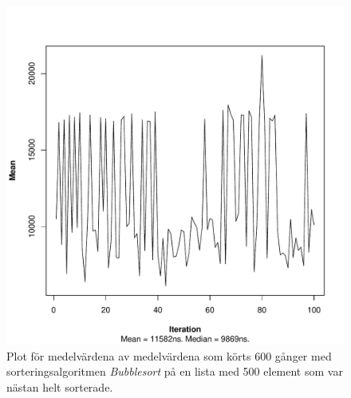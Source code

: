 \documentclass[a4paper]{article}
\begin{document}
\begin{figure}[H]
	\begin{center}
		\includegraphics[scale=0.4]{output/500/AlmostSorted/bubbleSort_almost_sorted_500_600_100.pdf}
		\caption{Plot för medelvärdena av medelvärdena som körts 600 gånger med sorteringsalgoritmen \emph{Bubblesort} på en lista med 500 element som var nästan helt sorterade.}
	\end{center}
\end{figure}
\end{document}
